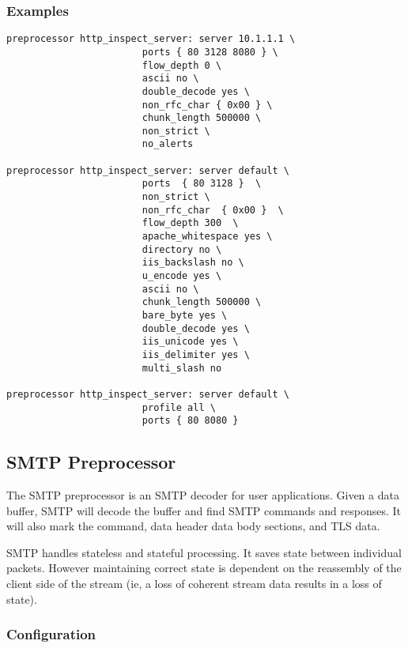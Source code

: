 \documentclass[english]{report}
\begin{document}
\subsubsection{Examples}

\begin{verbatim}
preprocessor http_inspect_server: server 10.1.1.1 \
                        ports { 80 3128 8080 } \
                        flow_depth 0 \
                        ascii no \
                        double_decode yes \
                        non_rfc_char { 0x00 } \
                        chunk_length 500000 \
                        non_strict \
                        no_alerts

preprocessor http_inspect_server: server default \ 
                        ports  { 80 3128 }  \
                        non_strict \
                        non_rfc_char  { 0x00 }  \
                        flow_depth 300  \
                        apache_whitespace yes \
                        directory no \
                        iis_backslash no \
                        u_encode yes \
                        ascii no \
                        chunk_length 500000 \
                        bare_byte yes \
                        double_decode yes \
                        iis_unicode yes \ 
                        iis_delimiter yes \
                        multi_slash no

preprocessor http_inspect_server: server default \
                        profile all \
                        ports { 80 8080 }
\end{verbatim}

\subsection{SMTP Preprocessor\label{SMTP}}

The SMTP preprocessor is an SMTP decoder for user applications.  Given a data buffer,
SMTP will decode the buffer and find SMTP commands and responses.
It will also mark the command, data header data body sections, and TLS data.

SMTP handles stateless and stateful processing.  It saves state
between individual packets.  However maintaining correct state is
dependent on the reassembly of the client side of the stream (ie, a
loss of coherent stream data results in a loss of state).

\subsubsection{Configuration}
\end{document}

